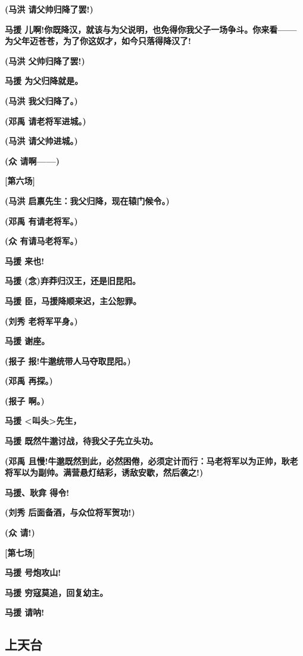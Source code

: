 \textbf{(马洪 请父帅归降了罢!)}

\textbf{马援
儿啊!你既降汉，就该与为父说明，也免得你我父子一场争斗。你来看------为父年迈苍苍，为了你这奴才，如今只落得降汉了!}

\textbf{(马洪 父帅归降了罢!)}

\textbf{马援 为父归降就是。}

\textbf{(马洪 我父归降了。)}

\textbf{(邓禹 请老将军进城。)}

\textbf{(马洪 请父帅进城。)}

\textbf{(众 请啊------)}

\textbf{{[}第六场{]}}

\textbf{(马洪 启禀先生：我父归降，现在辕门候令。)}

\textbf{(邓禹 有请老将军。)}

\textbf{(众 有请马老将军。)}

\textbf{马援 来也!}

\textbf{马援 (念)弃莽归汉王，还是旧昆阳。}

\textbf{马援 臣，马援降顺来迟，主公恕罪。}

\textbf{(刘秀 老将军平身。)}

\textbf{马援 谢座。}

\textbf{(报子 报!牛邈统带人马夺取昆阳。)}

\textbf{(邓禹 再探。)}

\textbf{(报子 啊。)}

\textbf{马援 \textless{}叫头\textgreater{}先生，}

\textbf{马援 既然牛邈讨战，待我父子先立头功。}

\textbf{(邓禹
且慢!牛邈既然到此，必然困倦，必须定计而行：马老将军以为正帅，耿老将军以为副帅。满营悬灯结彩，诱敌安歇，然后袭之!)}

\textbf{马援、耿弇 得令!}

\textbf{(刘秀 后面备酒，与众位将军贺功!)}

\textbf{(众 请!)}

\textbf{{[}第七场{]}}

\textbf{马援 号炮攻山!}

\textbf{马援 穷寇莫追，回复幼主。}

\textbf{马援 请呐!}

\newpage
\hypertarget{ux4e0aux5929ux53f0}{%
\subsection{上天台}\label{ux4e0aux5929ux53f0}}

